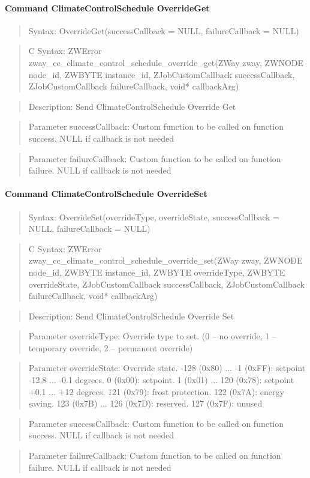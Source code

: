 \paragraph{Command ClimateControlSchedule OverrideGet}
\begin{quote}Syntax: OverrideGet(successCallback = NULL, failureCallback = NULL)\end{quote}
\begin{quote}C Syntax: ZWError zway\_cc\_climate\_control\_schedule\_override\_get(ZWay zway, ZWNODE node\_id, ZWBYTE instance\_id, ZJobCustomCallback successCallback, ZJobCustomCallback failureCallback, void* callbackArg)\end{quote}
\begin{quote}Description: Send ClimateControlSchedule Override Get\end{quote}
\begin{quote}Parameter successCallback: Custom function to be called on function success. NULL if callback is not needed\end{quote}
\begin{quote}Parameter failureCallback: Custom function to be called on function failure. NULL if callback is not needed\end{quote}


\paragraph{Command ClimateControlSchedule OverrideSet}
\begin{quote}Syntax: OverrideSet(overrideType, overrideState, successCallback = NULL, failureCallback = NULL)\end{quote}
\begin{quote}C Syntax: ZWError zway\_cc\_climate\_control\_schedule\_override\_set(ZWay zway, ZWNODE node\_id, ZWBYTE instance\_id, ZWBYTE overrideType, ZWBYTE overrideState, ZJobCustomCallback successCallback, ZJobCustomCallback failureCallback, void* callbackArg)\end{quote}
\begin{quote}Description: Send ClimateControlSchedule Override Set\end{quote}
\begin{quote}Parameter overrideType: Override type to set. (0 – no override, 1 – temporary override, 2 – permanent override)\end{quote}
\begin{quote}Parameter overrideState: Override state. -128 (0x80) ... -1 (0xFF): setpoint -12.8 ... -0.1 degrees. 0 (0x00): setpoint. 1 (0x01) ... 120 (0x78): setpoint +0.1 ... +12 degrees. 121 (0x79): frost protection. 122 (0x7A): energy saving. 123 (0x7B) ... 126 (0x7D): reserved. 127 (0x7F): unused\end{quote}
\begin{quote}Parameter successCallback: Custom function to be called on function success. NULL if callback is not needed\end{quote}
\begin{quote}Parameter failureCallback: Custom function to be called on function failure. NULL if callback is not needed\end{quote}



